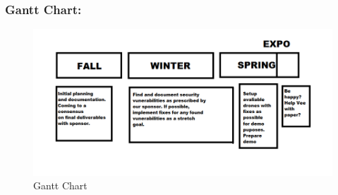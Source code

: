 \documentclass[IEEEtran,letterpaper,10pt,titlepage,draftclsnofoot,onecolumn]{article}
\begin{document}
\subsubsection*{Gantt Chart:}
\begin{figure}
  \includegraphics[width=\linewidth]{gantt.png}
  \caption{Gantt Chart}
  \label{fig:gantt}
\end{figure}

\clearpage

\nocite{*}


\end{document}
